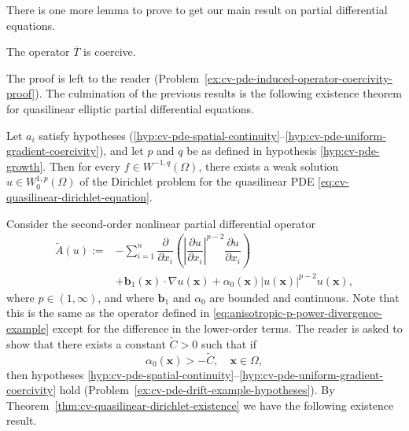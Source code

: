 There is one more lemma to prove to get our main result on partial differential equations.

\begin{Lemma}
\label{lem:cv-pde-induced-operator-coercivity}
The operator $\overline T$ is coercive.
\end{Lemma}

The proof is left to the reader (Problem~\ref{ex:cv-pde-induced-operator-coercivity-proof}). The culmination of the previous results is the following existence theorem for quasilinear elliptic partial differential equations.

\begin{Theorem}
\label{thm:cv-quasilinear-dirichlet-existence}
Let $a_i$ satisfy hypotheses (\ref{hyp:cv-pde-spatial-continuity}--\ref{hyp:cv-pde-uniform-gradient-coercivity}), and let $p$ and $q$ be as defined in hypothesis \ref{hyp:cv-pde-growth}. Then for every $f\in W^{-1,q}(\Omega)$, there exists a weak solution $u\in W_0^{1,p}(\Omega)$ of the Dirichlet problem for the quasilinear PDE \eqref{eq:cv-quasilinear-dirichlet-equation}.
\end{Theorem}

\begin{Example}
\label{ex:cv-quasilinear-anisotropic-drift-operator}
Consider the second-order nonlinear partial differential operator
\begin{equation}\label{eq:cv-quasilinear-anisotropic-drift-example}
\begin{aligned}\widetilde A(u):=&-\sum_{i=1}^n\dfrac{\partial}{\partial x_i}\left(\left|\dfrac{\partial u}{\partial x_i}\right|^{p-2}\dfrac{\partial u}{\partial x_i}\right)\\&+\bm{b}_1(\bm{x})\cdot\nabla u(\bm{x})+\alpha_0(\bm{x})|u(\bm{x})|^{p-2}u(\bm{x}),\end{aligned}
\end{equation}
where $p\in(1,\infty)$, and where $\bm{b}_1$ and $\alpha_0$ are bounded and continuous. Note that this is the same as the operator defined in \eqref{eq:anisotropic-p-power-divergence-example} except for the difference in the lower-order terms. The reader is asked to show that there exists a constant $\widetilde C>0$ such that if
\begin{equation}\label{eq:cv-quasilinear-negative-zero-order-coefficient-bound}
\alpha_0(\bm{x})>-\widetilde C,\quad\bm{x}\in\Omega,
\end{equation}
then hypotheses \ref{hyp:cv-pde-spatial-continuity}--\ref{hyp:cv-pde-uniform-gradient-coercivity} hold (Problem~\ref{ex:cv-pde-drift-example-hypotheses}). By Theorem~\ref{thm:cv-quasilinear-dirichlet-existence} we have the following existence result.
\end{Example}

